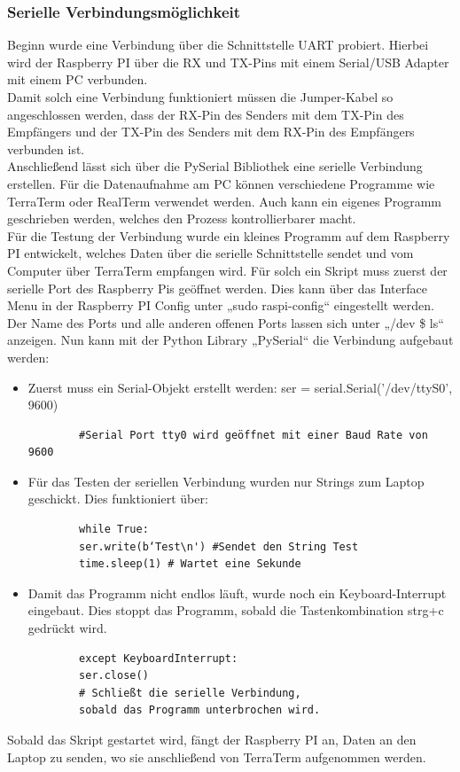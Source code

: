 \subsubsection{Serielle Verbindungsmöglichkeit}
Beginn wurde eine Verbindung über die Schnittstelle UART probiert. Hierbei wird der Raspberry PI über die RX und TX-Pins mit einem Serial/USB Adapter mit einem PC verbunden.\\
\vspace{3mm} 
Damit solch eine Verbindung funktioniert müssen die Jumper-Kabel so angeschlossen werden, dass der RX-Pin des Senders mit dem TX-Pin des Empfängers und der TX-Pin des Senders mit dem RX-Pin des Empfängers verbunden ist.\\
\vspace{3mm}
Anschließend lässt sich über die PySerial Bibliothek eine serielle Verbindung erstellen. Für die Datenaufnahme am PC können verschiedene Programme wie TerraTerm oder RealTerm verwendet werden. Auch kann ein eigenes Programm geschrieben werden, welches den Prozess kontrollierbarer macht. \\
\vspace{3mm}
Für die Testung der Verbindung wurde ein kleines Programm auf dem Raspberry PI entwickelt, welches Daten über die serielle Schnittstelle sendet und vom Computer über TerraTerm empfangen wird. Für solch ein Skript muss zuerst der serielle Port des Raspberry Pis geöffnet werden. Dies kann über das Interface Menu in der Raspberry PI Config unter „sudo raspi-config“ eingestellt werden. Der Name des Ports und alle anderen offenen Ports lassen sich unter „/dev  \$ ls“ anzeigen. 
\vspace{3mm}
Nun kann mit der Python Library „PySerial“ die Verbindung aufgebaut werden:
\begin{itemize}
	\item Zuerst muss ein Serial-Objekt erstellt werden:
	ser = serial.Serial('/dev/ttyS0', 9600)
	\begin{verbatim}
		#Serial Port tty0 wird geöffnet mit einer Baud Rate von 9600
	\end{verbatim}
	
\end{itemize}
\begin{itemize}
	\item Für das Testen der seriellen Verbindung wurden nur Strings zum Laptop geschickt. Dies funktioniert über:
	\begin{verbatim}
		while True:
		ser.write(b‘Test\n') #Sendet den String Test 
		time.sleep(1) # Wartet eine Sekunde
	\end{verbatim}
	\item Damit das Programm nicht endlos läuft, wurde noch ein Keyboard-Interrupt eingebaut. Dies stoppt das Programm, sobald die Tastenkombination strg+c gedrückt wird.
	\begin{verbatim}
		except KeyboardInterrupt:
		ser.close()  
		# Schließt die serielle Verbindung, 
		sobald das Programm unterbrochen wird.
	\end{verbatim}
\end{itemize}
Sobald das Skript gestartet wird, fängt der Raspberry PI an, Daten an den Laptop zu senden, wo sie anschließend von TerraTerm aufgenommen werden.


